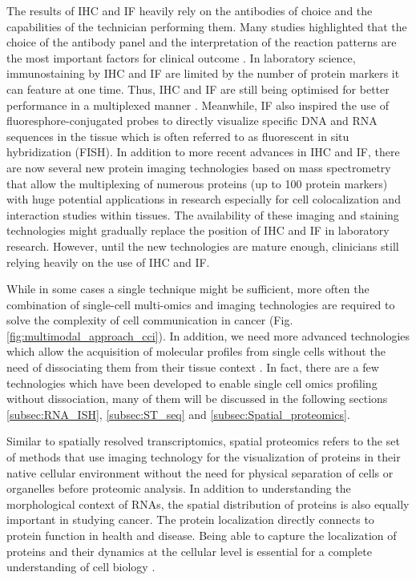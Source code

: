 The results of IHC and IF heavily rely on the antibodies of choice and the capabilities of the technician performing them. Many studies highlighted that the choice of the antibody panel and the interpretation of the reaction patterns are the most important factors for  clinical outcome \cite{de2010immunohistochemistry, jensen1997immunohistochemistry}. In laboratory science, immunostaining by IHC and IF are limited by the number of protein markers it can feature at one time. Thus, IHC and IF are still being optimised for better performance in a multiplexed manner \cite{joshi2017immunofluorescence}. Meanwhile, IF also inspired the use of fluoresphore-conjugated probes to directly visualize specific DNA and RNA sequences in the tissue which is often referred to as fluorescent in situ hybridization (FISH). In addition to more recent advances in IHC and IF, there are now several new protein imaging technologies based on mass spectrometry that allow the multiplexing of numerous proteins (up to 100 protein markers) with huge potential applications in research especially for cell colocalization and interaction studies within tissues. The availability of these imaging and staining technologies might gradually replace the position of IHC and IF in laboratory research. However, until the new technologies are mature enough, clinicians still relying heavily on the use of IHC and IF. 

While in some cases a single technique might be sufficient, more often the combination of single-cell multi-omics and imaging technologies are required to solve the complexity of cell communication in cancer (Fig.\ref{fig:multimodal_approach_cci}). In addition, we need more advanced technologies which allow the acquisition of molecular profiles from single cells without the need of dissociating them from their tissue context \cite{de2020unraveling}. In fact, there are a few technologies which have been developed to enable single cell omics profiling without dissociation, many of them will be discussed in the following sections \ref{subsec:RNA_ISH}, \ref{subsec:ST_seq} and \ref{subsec:Spatial_proteomics}.

Similar to spatially resolved transcriptomics, spatial proteomics refers to the set of methods that use imaging technology for the visualization of proteins in their native cellular environment without the need for physical separation of cells or organelles before proteomic analysis. In addition to understanding the morphological context of RNAs, the spatial distribution of proteins is also equally important in studying cancer. The protein localization directly connects to protein function in health and disease. Being able to capture the localization of proteins and their dynamics at the cellular level is essential for a complete understanding of cell biology \cite{lundberg2019spatial}. 

